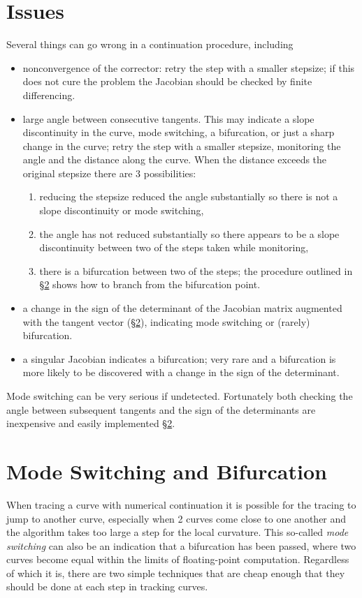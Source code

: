 \documentclass[10pt,openany,twoside]{book}
\numberwithin{equation}{section}   %
\newcommand{\Sectref}[1]{\S\ref{#1}}
\begin{document}
\section{Issues}\label{sect:issues}
Several things can go wrong in a continuation procedure, including
\begin{itemize}
	\item nonconvergence of the corrector: retry the step with a smaller
		stepsize; if this does not cure the problem the Jacobian should
		be checked by finite differencing.
	\item large angle between consecutive tangents. This may indicate
		a slope discontinuity in the curve, mode switching, a bifurcation,
		or just a sharp change in the curve; retry the step with a smaller
		stepsize, monitoring the angle and the distance along the curve.
		When the distance exceeds the original stepsize there are 3 possibilities:
		\begin{enumerate}
			\item reducing the stepsize reduced the angle substantially so there
				is not a slope discontinuity or mode switching,
			\item the angle has not reduced substantially so there appears to
				be a slope discontinuity between two of the steps taken
				while monitoring,
			\item there is a bifurcation between two of the steps; the procedure
				outlined in \Sectref{sect:bifurcation} shows how to branch from
				the bifurcation point.
		\end{enumerate}
	\item a change in the sign of the determinant of the Jacobian matrix
			augmented with the tangent vector (\Sectref{sect:bifurcation}),
			indicating mode switching or (rarely) bifurcation.
	\item a singular Jacobian indicates a bifurcation; very rare and
		a bifurcation is more likely to be discovered with a change in
		the sign of the determinant.
\end{itemize}
Mode switching can be very serious if undetected. Fortunately both checking
the angle between subsequent tangents and the sign of the determinants
are inexpensive and easily implemented \Sectref{sect:bifurcation}.

\section{Mode Switching and Bifurcation}\label{sect:bifurcation}
When tracing a curve with numerical continuation it is possible
for the tracing to jump to another curve, especially when
2 curves come close to one another and the algorithm takes too large
a step for the local curvature.
This so-called \emph{mode switching} can also be an indication that a
bifurcation has been passed, where two curves become equal within
the limits of floating-point computation.
Regardless of which it is, there are two simple techniques that are
cheap enough that they should be done at each step in tracking curves.
\end{document}
